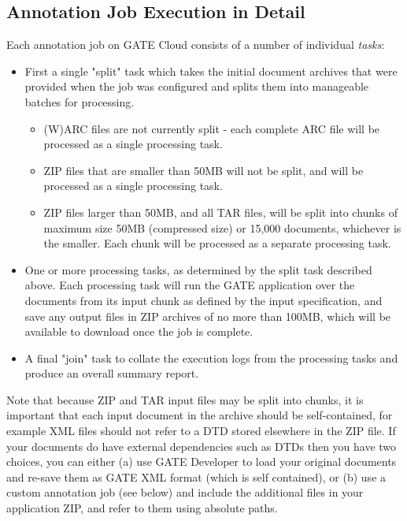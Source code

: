 \ifprintedbook

\subsection{Annotation Job Execution in Detail}

Each annotation job on GATE Cloud consists of a number of individual \emph{tasks}:

\begin{itemize}
\item First a single "split" task which takes the initial document archives that
  were provided when the job was configured and splits them into manageable
  batches for processing.
  \begin{itemize}
    \item (W)ARC files are not currently split - each complete ARC file will be
    processed as a single processing task.
    \item ZIP files that are smaller than 50MB will not be split, and will be
    processed as a single processing task.
    \item ZIP files larger than 50MB, and all TAR files, will be split into chunks of
    maximum size 50MB (compressed size) or 15,000 documents, whichever is the
    smaller.  Each chunk will be processed as a separate processing task.
  \end{itemize}
\item One or more processing tasks, as determined by the split task described
  above. Each processing task will run the GATE application over the documents from
    its input chunk as defined by the input specification, and save any output
    files in ZIP archives of no more than 100MB, which will be available to
    download once the job is complete.
\item A final "join" task to collate the execution logs from the processing tasks
  and produce an overall summary report.
\end{itemize}

Note that because ZIP and TAR input files may be split into chunks, it is
important that each input document in the archive should be self-contained, for
example XML files should not refer to a DTD stored elsewhere in the ZIP file.
If your documents do have external dependencies such as DTDs then you have two
choices, you can either (a) use GATE Developer to load your original documents
and re-save them as GATE XML format (which is self contained), or (b) use a
custom annotation job (see below) and include the additional files in
your application ZIP, and refer to them using absolute paths.

